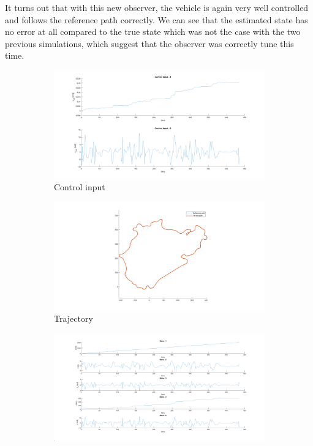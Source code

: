 It turns out that with this new observer, the vehicle is again very well controlled and follows the reference path correctly. We can see that the estimated state has no error at all compared to the true state which was not the case with the two previous simulations, which suggest that the observer was correctly tune this time.

\begin{figure}[H]
    \centering
     \begin{subfigure}[b]{0.45\textwidth}
         \centering
         \includegraphics[width=\textwidth]{Latex report/image/ex2/inputNewpole.png}
         \caption{Control input}
         \label{fig:NPinput}
     \end{subfigure}
     \begin{subfigure}[b]{0.45\textwidth}
         \centering
         \includegraphics[width=\textwidth]{Latex report/image/ex2/trajectoryNewpole.png}
         \caption{Trajectory}
         \label{fig:NPtraj}
     \end{subfigure}
     \begin{subfigure}[b]{0.8\textwidth}
         \centering
         \includegraphics[width=\textwidth]{Latex report/image/ex2/stateNewpole.png}

\end{subfigure}
\end{figure}
